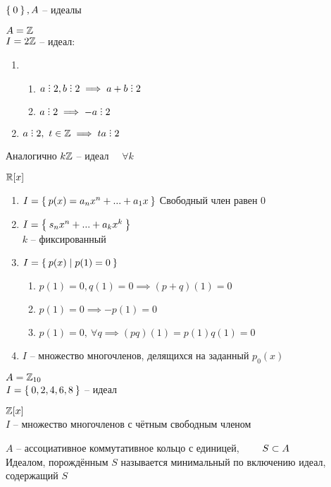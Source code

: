 \begin{exmpls}
	\item $ \Set{0}, A $ -- идеалы
	\item $ A = \mathbb{Z} $ \\
	$ I = 2\mathbb{Z} $ -- идеал:
	\begin{enumerate}
		\item
		\begin{enumerate}
			\item $ a \divby 2, b \divby 2 \implies a + b \divby 2 $
			\item $ a \divby 2 \implies -a \divby 2 $
		\end{enumerate}
		\item $ a \divby 2, ~ t \in \Z \implies ta \divby 2 $
	\end{enumerate}
	Аналогично $ k\mathbb{Z} $ -- идеал $ \quad \forall k $
	\item $ \mathbb{R}[x] $
	\begin{enumerate}
		\item $ I = \Set{p(x) = a_nx^n + ... + a_1x} $
		Свободный член равен 0
		\item $ I = \Set{s_nx^n + ... + a_kx^k} $ \\
		$ k $ -- фиксированный
		\item $ I = \Set{p(x) | p(1) = 0} $
		\begin{enumerate}
			\item $ p(1) = 0, q(1) = 0 \implies (p + q)(1) = 0 $
			\item $ p(1) = 0 \implies -p(1) = 0 $
			\item $ p(1) = 0, ~ \forall q \implies (pq)(1) = p(1)q(1) = 0 $
		\end{enumerate}
		\item $ I $ -- множество многочленов, делящихся на заданный $ p_0(x) $
	\end{enumerate}
	\item $ A = \mathbb{Z}_{10} $ \\
	$ I = \Set{0, 2, 4, 6, 8} $ -- идеал
	\item $ \mathbb{Z}[x] $ \\
	$ I $ -- множество многочленов с чётным свободным членом
\end{exmpls}

\begin{definition}
	$ A $ -- ассоциативное коммутативное кольцо с единицей, $ \qquad S \subset A $ \\
	Идеалом, порождённым $ S $ называется минимальный по включению идеал, содержащий $ S $
\end{definition}

